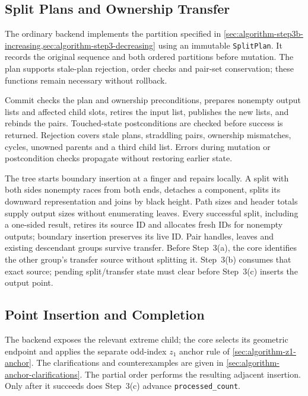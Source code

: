 \subsection{Split Plans and Ownership Transfer}
\label{sec:implementation-step3b}

The ordinary backend implements the partition specified in
\cref{sec:algorithm-step3b-increasing,sec:algorithm-step3-decreasing}
using an immutable \texttt{SplitPlan}. It records the original sequence and
both ordered partitions before mutation. The plan supports stale-plan
rejection, order checks and pair-set conservation; these functions remain
necessary without rollback.

Commit checks the plan and ownership preconditions, prepares nonempty output
lists and affected child slots, retires the input list, publishes the new
lists, and rebinds the pairs. Touched-state postconditions are checked before
success is returned. Rejection covers stale plans, straddling pairs, ownership
mismatches, cycles, unowned parents and a third child list. Errors during
mutation or postcondition checks propagate without restoring earlier state.

The tree starts boundary insertion at a finger and repairs locally. A split
with both sides nonempty races from both ends, detaches a component, splits
its downward representation and joins by black height. Path sizes and header
totals supply output sizes without enumerating leaves. Every successful split,
including a one-sided result, retires its source ID and allocates fresh IDs
for nonempty outputs; boundary insertion preserves its live ID. Pair handles,
leaves and existing descendant groups survive transfer. Before Step~3(a), the
core identifies the other group's transfer source without splitting it.
Step~3(b) consumes that exact source; pending split/transfer state must clear
before Step~3(c) inserts the output point.

\subsection{Point Insertion and Completion}
\label{sec:implementation-step3c}

The backend exposes the relevant extreme child; the core selects its
geometric endpoint and applies the separate odd-index $z_1$ anchor rule of
\cref{sec:algorithm-z1-anchor}. The clarifications and counterexamples are
given in \cref{sec:algorithm-anchor-clarifications}. The partial
order performs the resulting adjacent insertion. Only after it succeeds does
Step~3(c) advance \texttt{processed\_count}.

